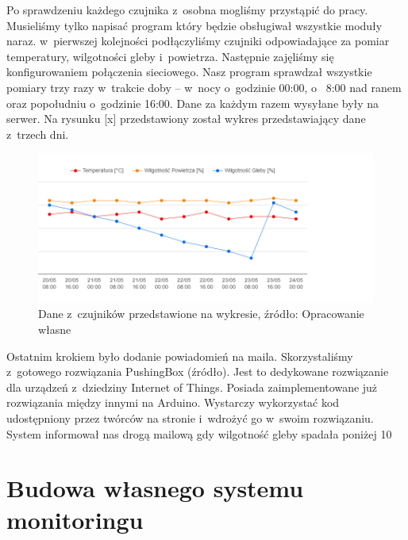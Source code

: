 \documentclass{xmgr}
\begin{document}
	Po sprawdzeniu każdego czujnika z~osobna mogliśmy przystąpić do pracy. Musieliśmy tylko napisać program który będzie obsługiwał wszystkie moduły naraz. w~pierwszej kolejności podłączyliśmy czujniki odpowiadające za pomiar temperatury, wilgotności gleby i~powietrza. Następnie zajęliśmy się konfigurowaniem połączenia sieciowego. Nasz program sprawdzał wszystkie pomiary trzy razy w~trakcie doby – w~nocy o~godzinie 00:00, o~ 8:00 nad ranem oraz popołudniu o~godzinie 16:00. Dane za każdym razem wysyłane były na serwer. Na rysunku [x] przedstawiony został wykres przedstawiający dane z~trzech dni.

\begin{figure}[h]
\centering
\includegraphics[width=\textwidth]{pawel_wykres}
\caption{Dane z~czujników przedstawione na wykresie, źródło: Opracowanie własne}
\label{fig:iot}
\end{figure}

	Ostatnim krokiem było dodanie powiadomień na maila. Skorzystaliśmy z~gotowego rozwiązania PushingBox (źródło). Jest to dedykowane rozwiązanie dla urządzeń z~dziedziny Internet of Things. Posiada zaimplementowane już rozwiązania między innymi na Arduino.   Wystarczy wykorzystać kod udostępniony przez twórców na stronie i~wdrożyć go w~swoim rozwiązaniu. System informował nas drogą mailową gdy wilgotność gleby spadała poniżej 10%
\section{Budowa własnego systemu monitoringu}
\end{document}
